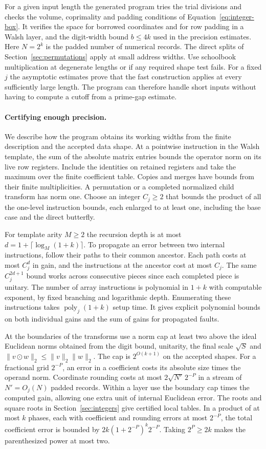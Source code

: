 For a given input length the generated program tries the trial
divisions and checks the volume, coprimality and padding conditions
of Equation~\eqref{eq:integer-box}. It verifies the space for
borrowed coordinates and for row padding in a Walsh layer, and the
digit-width bound $b\le4k$ used in the precision estimates. Here
$N=2^k$ is the padded number of numerical records. The direct splits
of Section~\ref{sec:permutations} apply at small address widths.
Use schoolbook multiplication at degenerate lengths or if any
required shape test fails. For a fixed $j$ the asymptotic estimates
prove that the fast construction applies at every sufficiently large
length. The program can therefore handle short inputs without
having to compute a cutoff from a prime-gap estimate.

\paragraph{Certifying enough precision.}
We describe how the program obtains its working widths from the
finite description and the accepted data shape. At a pointwise
instruction in the Walsh template, the sum of the absolute matrix
entries bounds the operator norm on its live row registers. Include
the identities on retained registers and take the maximum over the
finite coefficient table. Copies and merges have bounds from their
finite multiplicities. A permutation or a completed normalized child
transform has norm one. Choose an integer $C_j\ge2$ that bounds the
product of all the one-level instruction bounds, each enlarged to
at least one, including the base case and the direct butterfly.

For template arity $M\ge2$ the recursion depth is at most
$d=1+\lceil\log_M(1+k)\rceil$. To propagate an error between two
internal instructions, follow their paths to their common ancestor.
Each path costs at most $C_j^d$ in gain, and the instructions at the
ancestor cost at most $C_j$. The same $C_j^{2d+1}$ bound works
across consecutive pieces since each completed piece is unitary.
The number of array instructions is polynomial in $1+k$ with
computable exponent, by fixed branching and logarithmic depth.
Enumerating these instructions takes $\operatorname{poly}_j(1+k)$
setup time. It gives explicit polynomial bounds on both individual
gains and the sum of gains for propagated faults.

At the boundaries of the transforms use a norm cap at least two
above the ideal Euclidean norms obtained from the digit bound,
unitarity, the final scale $\sqrt S$ and
$\|v\odot w\|_2\le\|v\|_2\|w\|_2$. The cap is $2^{O(k+1)}$ on the
accepted shapes. For a fractional grid $2^{-P}$, an error in a
coefficient costs its absolute size times the operand norm.
Coordinate rounding costs at most $2\sqrt{N'}\,2^{-P}$ in a stream
of $N'=O_j(N)$ padded records. Within a layer use the boundary cap
times the computed gain, allowing one extra unit of internal
Euclidean error. The roots and square roots in Section~\ref{sec:integers}
give certified local tables. In a product of at most $k$ phases,
each with coefficient and rounding errors at most $2^{-P}$, the
total coefficient error is bounded by
$2k(1+2^{-P})^k2^{-P}$. Taking $2^P\ge2k$ makes the parenthesized
power at most two.

